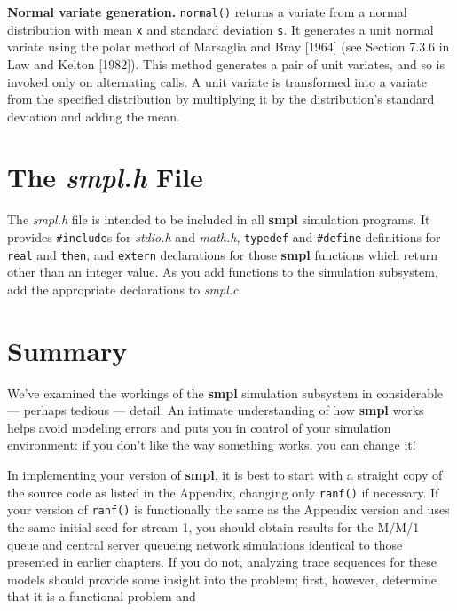 \textbf{Normal variate generation.} \texttt{normal()} returns a variate from a normal
distribution with mean \texttt{x} and standard deviation \texttt{s}. It generates a unit
normal variate using the polar method of Marsaglia and Bray [1964] (see
Section 7.3.6 in Law and Kelton [1982]). This method generates a pair of unit
variates, and so is invoked only on alternating calls. A unit variate is transformed
into a variate from the specified distribution by multiplying it by
the distribution's standard deviation and adding the mean.

\section{The \textit{smpl.h} File}

The \textit{smpl.h} file is intended to be included in all \textbf{smpl} simulation
programs. It provides \texttt{\#include}s for \textit{stdio.h} and \textit{math.h}, \texttt{typedef} and
\texttt{\#define} definitions for \texttt{real} and \texttt{then}, and \texttt{extern} declarations for those
\textbf{smpl} functions which return other than an integer value. As you add functions
to the simulation subsystem, add the appropriate declarations to
\textit{smpl.c}.

\section{Summary}

We've examined the workings of the \textbf{smpl} simulation subsystem in
considerable --- perhaps tedious --- detail. An intimate understanding of how
\textbf{smpl} works helps avoid modeling errors and puts you in control of your
simulation environment: if you don't like the way something works, you can
change it!

In implementing your version of \textbf{smpl}, it is best to start with a straight
copy of the source code as listed in the Appendix, changing only \texttt{ranf()} if
necessary. If your version of \texttt{ranf()} is functionally the same as the
Appendix version and uses the same initial seed for stream 1, you should
obtain results for the M/M/1 queue and central server queueing network
simulations identical to those presented in earlier chapters. If you do not,
analyzing trace sequences for these models should provide some insight into
the problem; first, however, determine that it is a functional problem and


